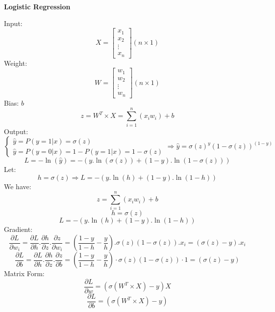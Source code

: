 \documentclass{article}
\begin{document}
    \begin{center}
        \LARGE \textbf{Logistic Regression}
    \end{center}
    Input: 
    \[
        X = 
        \begin{bmatrix}
            x_1 \\
            x_2 \\
            \vdots \\
            x_n
        \end{bmatrix}
        (n \times 1)
    \] 
    Weight: 
    \[
        W = 
        \begin{bmatrix}
            w_1 \\
            w_2 \\
            \vdots \\
            w_n
        \end{bmatrix}
        (n \times 1)
    \]
    Bias: $b$
    \[
        z = W^{T} \times X = \sum_{i = 1}^{n}\left(x_iw_i\right) + b
    \]
    Output:
    \[
        \begin{cases}
            \hat{y} = P(y = 1 | x) = \sigma(z) \\
            \hat{y} = P(y = 0 | x) = 1 - P(y = 1 | x) = 1 - \sigma(z)
        \end{cases}
        \Rightarrow \hat{y} = \sigma(z)^y(1 - \sigma(z))^(1-y)
    \]
    \[
        L = -\ln\left(\hat{y}\right) 
          = -\left( y.\ln\left(\sigma(z)\right) + (1-y).\ln\left(1-\sigma(z)\right)\right)
    \]
    Let: 
    \[
        h = \sigma(z)
        \Rightarrow L = -\left( y.\ln\left(h\right) + (1-y).\ln\left(1-h\right)\right)
    \]
    We have:
    \[
        z = \sum_{i = 1}^{n}\left(x_iw_i\right) + b
    \]
    \[
        h = \sigma(z)
    \]
    \[
        L = -\left( y.\ln\left(h\right) + (1-y).\ln\left(1-h\right)\right)
    \]
    Gradient:
    \[
        \frac{\partial L}{\partial w_i} = 
        \frac{\partial L}{\partial h}. 
        \frac{\partial h}{\partial z}.
        \frac{\partial z}{\partial w_i} =
        \left(\frac{1-y}{1-h} - \frac{y}{h}\right) .
        \sigma(z)(1-\sigma(z)) . x_i = 
        (\sigma(z) - y).x_i
    \]
    \[
        \frac{\partial L}{\partial b} = 
        \frac{\partial L}{\partial h}. 
        \frac{\partial h}{\partial z}.
        \frac{\partial z}{\partial b} = 
        \left(\frac{1-y}{1-h} - \frac{y}{h}\right) \cdot \sigma(z)(1-\sigma(z)) \cdot 1 =
        (\sigma(z) - y)
    \]
    Matrix Form:
    \[
        \frac{\partial L}{\partial w} = 
        \left(\sigma(W^{T} \times X)  - y\right)X
    \]
    \[
        \frac{\partial L}{\partial b} = 
        \left(\sigma(W^{T} \times X)  - y\right)
    \]
\end{document}
